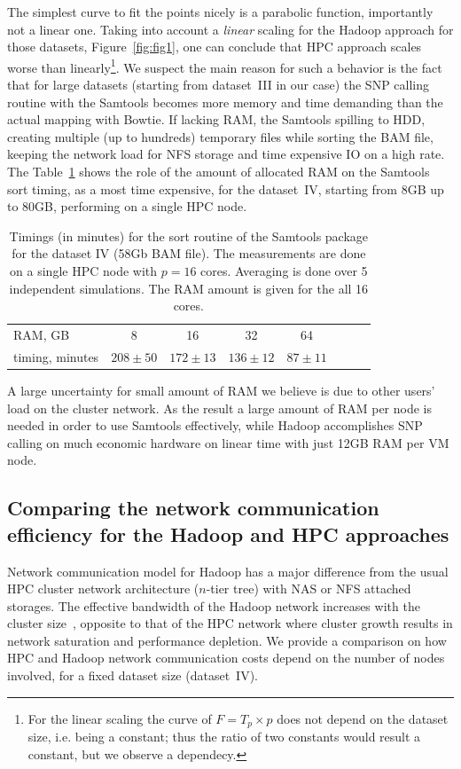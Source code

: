 \documentclass[11pt, oneside]{article}   	%
\begin{document}
The simplest curve to fit the points nicely is a parabolic function, importantly not a linear one. Taking into account  a {\it linear} scaling for the Hadoop approach for those datasets, Figure~\ref{fig:fig1}, one can conclude that HPC approach scales worse than linearly\footnote{For the linear scaling the curve of $F=T_{p}\times p$ does not depend on the dataset size, i.e. being a constant; thus the ratio of two constants would result a constant, but we observe a dependecy.}. We suspect the main reason for such a behavior is the fact that for large datasets (starting from dataset~III in our case) the SNP calling routine with the Samtools becomes more memory and time demanding than the actual mapping with Bowtie.
If lacking  RAM, the Samtools spilling to HDD, creating multiple (up to hundreds) temporary files while sorting the BAM file, keeping the network load for NFS storage and  time expensive IO on a high rate.
The Table~\ref{table:5} shows the role of the amount of  allocated RAM on the Samtools sort timing, as a most time expensive,  for the dataset~IV, starting from 8GB up to 80GB, performing on a single HPC node. 
\begin{table}[htdp]
\small

\caption{Timings (in minutes) for the sort routine of the Samtools package for the dataset IV (58Gb BAM file). The measurements are done on a single HPC node with $p=16$ cores. Averaging is done over 5 independent simulations. The RAM amount is given for the all  16 cores. }
\begin{center}
\begin{tabular}{|l|c|c|c|c|c|c|c|}
RAM, GB		&	8			&		16			&			32		& 		64				\\
timing, minutes	&	$208\pm50$	&	$172\pm13$		&	$136\pm12$		& 	$87\pm11$			\\
\end{tabular}
\end{center}
\label{table:5}
\normalsize
\end{table}%
A large uncertainty for  small amount of RAM we believe is due to other users' load  on the cluster network.
As the  result a large amount of RAM per node is needed in order to use Samtools effectively, while Hadoop accomplishes SNP calling  on much economic hardware on linear time  with just 12GB RAM per VM node.





 \subsection{Comparing the network communication efficiency for the Hadoop and HPC approaches }
Network communication model for Hadoop has a major difference from the usual HPC cluster network architecture ($n$-tier tree) with NAS or NFS attached storages. The effective bandwidth of the Hadoop network increases with the cluster size~\cite{Sammer:2012}, opposite to that of the HPC network where cluster growth results in network saturation and performance depletion.
We provide a comparison on how HPC and Hadoop network communication costs depend on the number of nodes involved, for a fixed dataset size (dataset~IV).
 
\end{document}
